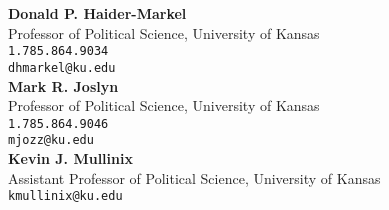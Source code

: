 \documentclass[margin,line,pifont,palatino,courier]{res}
\begin{document}
\begin{resume}
\textbf{Donald P. Haider-Markel} \\
Professor of Political Science, University of Kansas \\
\verb+1.785.864.9034+\\
\texttt{dhmarkel@ku.edu}\\

\textbf{Mark R. Joslyn} \\
Professor of Political Science, University of Kansas \\
\verb+1.785.864.9046+\\
\texttt{mjozz@ku.edu}\\



\textbf{Kevin J. Mullinix} \\
Assistant Professor of Political Science, University of Kansas \\
\texttt{kmullinix@ku.edu}\\

\end{resume}
\end{document}
